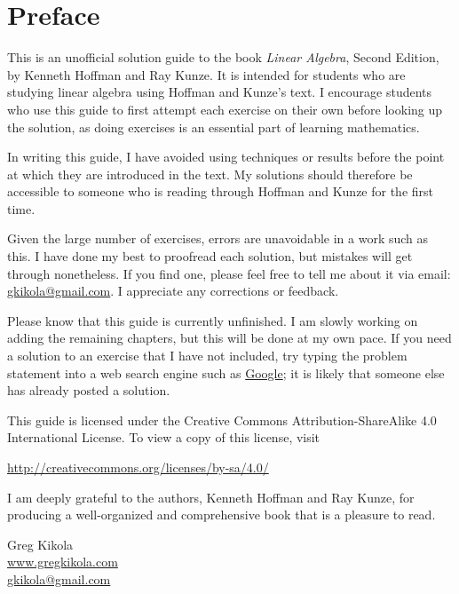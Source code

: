 \chapter{Preface}

This is an unofficial solution guide to the book {\em Linear Algebra},
Second Edition, by Kenneth Hoffman and Ray Kunze. It is intended for
students who are studying linear algebra using Hoffman and Kunze's
text. I encourage students who use this guide to first attempt each
exercise on their own before looking up the solution, as doing
exercises is an essential part of learning mathematics.

In writing this guide, I have avoided using techniques or results
before the point at which they are introduced in the text. My
solutions should therefore be accessible to someone who is reading
through Hoffman and Kunze for the first time.

Given the large number of exercises, errors are unavoidable in a work
such as this. I have done my best to proofread each solution, but
mistakes will get through nonetheless. If you find one, please feel
free to tell me about it via email:
\href{mailto:gkikola@gmail.com}{gkikola@gmail.com}. I appreciate any
corrections or feedback.

Please know that this guide is currently unfinished. I am slowly
working on adding the remaining chapters, but this will be done at my
own pace. If you need a solution to an exercise that I have not
included, try typing the problem statement into a web search engine
such as \href{https://www.google.com/}{Google}; it is likely that
someone else has already posted a solution.

This guide is licensed under the Creative Commons
Attribution-ShareAlike 4.0 International License. To view a copy of
this license, visit
\begin{center}
  \href{http://creativecommons.org/licenses/by-sa/4.0/}
  {http://creativecommons.org/licenses/by-sa/4.0/}
\end{center}

I am deeply grateful to the authors, Kenneth Hoffman and Ray Kunze,
for producing a well-organized and comprehensive book that is a
pleasure to read.

\begin{flushright}
  Greg Kikola\\
  \href{https://www.gregkikola.com/}{www.gregkikola.com}\\
  \href{mailto:gkikola@gmail.com}{gkikola@gmail.com}
\end{flushright}
